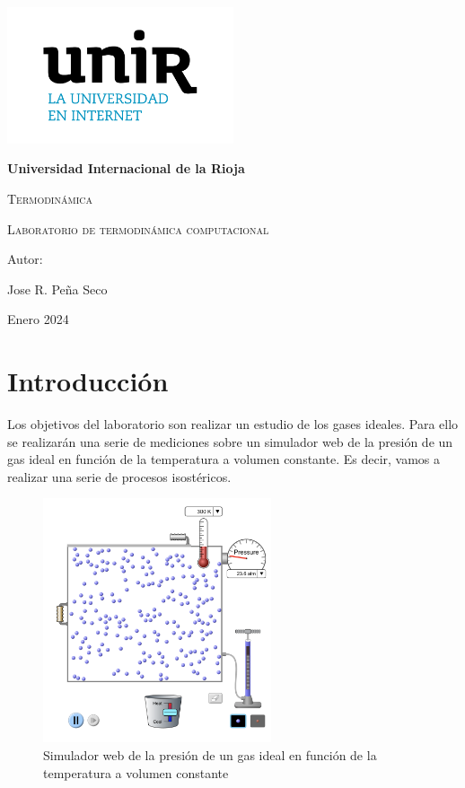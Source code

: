 \documentclass{article}
\begin{document}
\begin{titlepage}
\centering
    {\includegraphics[width=0.5\textwidth]{logo}\par}
    \vspace{1cm}
    {\bfseries\LARGE Universidad Internacional de la Rioja \par}
    \vspace{1cm}
    {\scshape\Large Termodinámica \par}
    \vspace{3cm}
    {\scshape\Huge Laboratorio de termodinámica computacional \par}
    \vspace{3cm}
    \vfill
    {\Large Autor: \par}
    {\Large Jose R. Peña Seco \par}
    \vfill
    {\Large Enero 2024 \par}
\end{titlepage}

\tableofcontents
\pagebreak

\section{Introducción}


Los objetivos del laboratorio son realizar un estudio de los gases ideales. 
Para ello se realizarán una serie de mediciones sobre un simulador web de la presión de un gas ideal 
en función de la temperatura a volumen constante. Es decir, vamos a realizar una serie de procesos isostéricos.

\begin{figure}[h]
    \centering
    \includegraphics[width=0.6\textwidth]{lab2}
    \caption{Simulador web de la presión de un gas ideal en función de la temperatura a volumen constante}
\end{figure}
\end{document}
